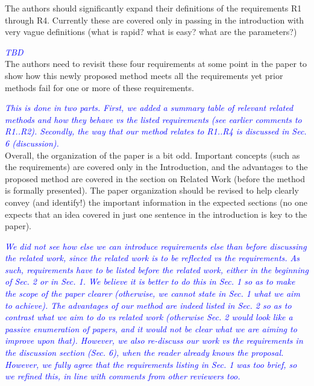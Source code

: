 \documentclass[a4paper,10pt]{article}
\newcommand{\rr}[1]{\emph{\textcolor{blue}{#1}}}
\begin{document}
    The authors should significantly expand their definitions of the requirements R1
    through R4. Currently these are covered only in passing in the introduction with
    very vague definitions (what is rapid? what is easy? what are the parameters?)
    
    \rr{TBD}\\

    The authors need to revisit these four requirements at some point in the paper
    to show how this newly proposed method meets all the requirements yet prior
    methods fail for one or more of these requirements.
    
    \rr{This is done in two parts. First, we added a summary table of relevant related methods and how they behave vs the listed requirements (see earlier comments to R1..R2). Secondly, the way that our method relates to R1..R4 is discussed in Sec. 6 (discussion).}\\

    Overall, the organization of the paper is a bit odd. Important concepts (such as
    the requirements) are covered only in the Introduction, and the advantages to the
    proposed method are covered in the section on Related Work (before the method is
    formally presented).  The paper organization should be revised to help clearly
    convey (and identify!) the important information in the expected sections (no one
    expects that an idea covered in just one sentence in the introduction is key to
    the paper).
    
    \rr{We did not see how else we can introduce requirements else than before discussing the related work, since the related work is to be reflected vs the requirements. As such, requirements have to be listed before the related work, either in the beginning of Sec. 2 or in Sec. 1. We believe it is better to do this in Sec. 1 so as to make the scope of the paper clearer (otherwise, we cannot state in Sec. 1 what we aim to achieve). The advantages of our method are indeed listed in Sec. 2 so as to contrast what we aim to do vs related work (otherwise Sec. 2 would look like a passive enumeration of papers, and it would not be clear what we are aiming to improve upon that). However, we also re-discuss our work vs the requirements in the discussion section (Sec. 6), when the reader already knows the proposal. However, we fully agree that the requirements listing in Sec. 1 was too brief, so we refined this, in line with comments from other reviewers too.}\\
\end{document}
